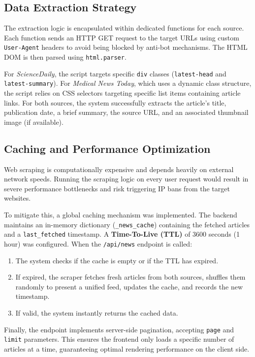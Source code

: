 \subsection{Data Extraction Strategy}
The extraction logic is encapsulated within dedicated functions for each source. Each function sends an HTTP GET request to the target URLs using custom \texttt{User-Agent} headers to avoid being blocked by anti-bot mechanisms. The HTML DOM is then parsed using \texttt{html.parser}. 

For \textit{ScienceDaily}, the script targets specific \texttt{div} classes (\texttt{latest-head} and \texttt{latest-summary}). For \textit{Medical News Today}, which uses a dynamic class structure, the script relies on CSS selectors targeting specific list items containing article links. For both sources, the system successfully extracts the article's title, publication date, a brief summary, the source URL, and an associated thumbnail image (if available).

\subsection{Caching and Performance Optimization}
Web scraping is computationally expensive and depends heavily on external network speeds. Running the scraping logic on every user request would result in severe performance bottlenecks and risk triggering IP bans from the target websites.

To mitigate this, a global caching mechanism was implemented. The backend maintains an in-memory dictionary (\texttt{\_news\_cache}) containing the fetched articles and a \texttt{last\_fetched} timestamp. A \textbf{Time-To-Live (TTL)} of 3600 seconds (1 hour) was configured. When the \texttt{/api/news} endpoint is called:
\begin{enumerate}
    \item The system checks if the cache is empty or if the TTL has expired.
    \item If expired, the scraper fetches fresh articles from both sources, shuffles them randomly to present a unified feed, updates the cache, and records the new timestamp.
    \item If valid, the system instantly returns the cached data.
\end{enumerate}
Finally, the endpoint implements server-side pagination, accepting \texttt{page} and \texttt{limit} parameters. This ensures the frontend only loads a specific number of articles at a time, guaranteeing optimal rendering performance on the client side.

